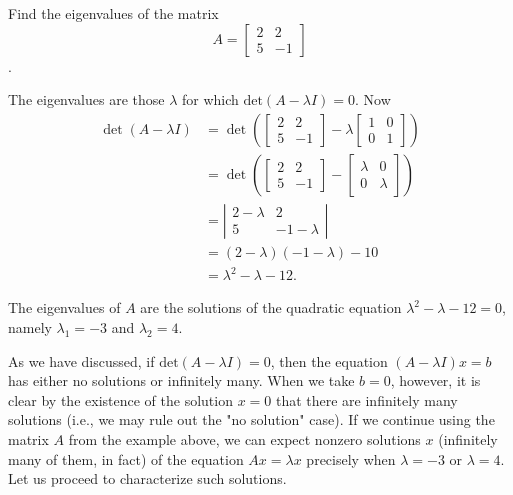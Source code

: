\begin{example}
    Find the eigenvalues of the matrix \[ A = \begin{bmatrix} 2 & 2 \\ 5 & -1 \end{bmatrix} \].

The eigenvalues are those \( \lambda \) for which \( \text{det}(A - \lambda I) = 0 \). Now 
$$
\begin{aligned}
\operatorname{det}({A}-\lambda {I}) & =\operatorname{det}\left(\left[\begin{array}{cc}
2 & 2 \\
5 & -1
\end{array}\right]-\lambda\left[\begin{array}{ll}
1 & 0 \\
0 & 1
\end{array}\right]\right) \\
& =\operatorname{det}\left(\left[\begin{array}{cc}
2 & 2 \\
5 & -1
\end{array}\right]-\left[\begin{array}{cc}
\lambda & 0 \\
0 & \lambda
\end{array}\right]\right) \\
& =\left|\begin{array}{cc}
2-\lambda & 2 \\
5 & -1-\lambda
\end{array}\right| \\
& =(2-\lambda)(-1-\lambda)-10 \\
& =\lambda^2-\lambda-12 .
\end{aligned}
$$



The eigenvalues of \( A \) are the solutions of the quadratic equation \( \lambda^2 - \lambda - 12 = 0 \), namely \( \lambda_1 = -3 \) and \( \lambda_2 = 4 \).

As we have discussed, if \( \text{det}(A - \lambda I) = 0 \), then the equation \( (A - \lambda I)x = b \) has either no solutions or infinitely many. When we take \( b = 0 \), however, it is clear by the existence of the solution \( x = 0 \) that there are infinitely many solutions (i.e., we may rule out the "no solution" case). If we continue using the matrix \( A \) from the example above, we can expect nonzero solutions \( x \) (infinitely many of them, in fact) of the equation \( Ax = \lambda x \) precisely when \( \lambda = -3 \) or \( \lambda = 4 \). Let us proceed to characterize such solutions.


\end{example}
